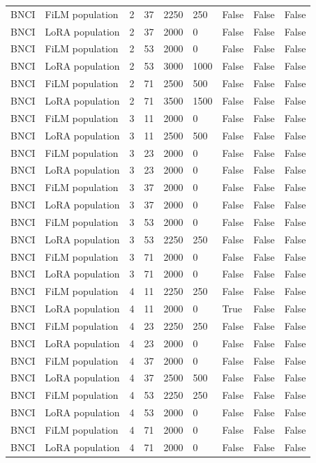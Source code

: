 \begin{longtable}{lllllllll}
BNCI & FiLM population & 2 & 37 & 2250 & 250 & False & False & False \\
BNCI & LoRA population & 2 & 37 & 2000 & 0 & False & False & False \\
BNCI & FiLM population & 2 & 53 & 2000 & 0 & False & False & False \\
BNCI & LoRA population & 2 & 53 & 3000 & 1000 & False & False & False \\
BNCI & FiLM population & 2 & 71 & 2500 & 500 & False & False & False \\
BNCI & LoRA population & 2 & 71 & 3500 & 1500 & False & False & False \\
BNCI & FiLM population & 3 & 11 & 2000 & 0 & False & False & False \\
BNCI & LoRA population & 3 & 11 & 2500 & 500 & False & False & False \\
BNCI & FiLM population & 3 & 23 & 2000 & 0 & False & False & False \\
BNCI & LoRA population & 3 & 23 & 2000 & 0 & False & False & False \\
BNCI & FiLM population & 3 & 37 & 2000 & 0 & False & False & False \\
BNCI & LoRA population & 3 & 37 & 2000 & 0 & False & False & False \\
BNCI & FiLM population & 3 & 53 & 2000 & 0 & False & False & False \\
BNCI & LoRA population & 3 & 53 & 2250 & 250 & False & False & False \\
BNCI & FiLM population & 3 & 71 & 2000 & 0 & False & False & False \\
BNCI & LoRA population & 3 & 71 & 2000 & 0 & False & False & False \\
BNCI & FiLM population & 4 & 11 & 2250 & 250 & False & False & False \\
BNCI & LoRA population & 4 & 11 & 2000 & 0 & True & False & False \\
BNCI & FiLM population & 4 & 23 & 2250 & 250 & False & False & False \\
BNCI & LoRA population & 4 & 23 & 2000 & 0 & False & False & False \\
BNCI & FiLM population & 4 & 37 & 2000 & 0 & False & False & False \\
BNCI & LoRA population & 4 & 37 & 2500 & 500 & False & False & False \\
BNCI & FiLM population & 4 & 53 & 2250 & 250 & False & False & False \\
BNCI & LoRA population & 4 & 53 & 2000 & 0 & False & False & False \\
BNCI & FiLM population & 4 & 71 & 2000 & 0 & False & False & False \\
BNCI & LoRA population & 4 & 71 & 2000 & 0 & False & False & False \\
\bottomrule
\end{longtable}
